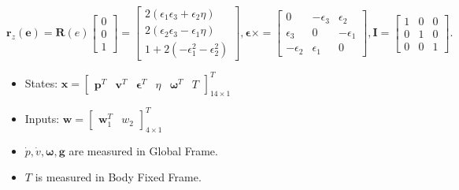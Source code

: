 \documentclass{beamer}
\begin{document}
\begin{frame}
    \begin{equation}
        \boldsymbol{r}_{z}(\boldsymbol{e})=\boldsymbol{R}(e)\left[\begin{array}{l}
                0 \\
                0 \\
                1
            \end{array}\right]=\left[\begin{array}{c}
                2\left(\epsilon_{1} \epsilon_{3}+\epsilon_{2} \eta\right) \\
                2\left(\epsilon_{2} \epsilon_{3}-\epsilon_{1} \eta\right) \\
                1+2\left(-\epsilon_{1}^{2}-\epsilon_{2}^{2}\right)
            \end{array}\right], \boldsymbol{\epsilon} \times=\left[\begin{array}{ccc}
                0             & -\epsilon_{3} & \epsilon_{2}  \\
                \epsilon_{3}  & 0             & -\epsilon_{1} \\
                -\epsilon_{2} & \epsilon_{1}  & 0
            \end{array}\right], \boldsymbol{I}=\left[\begin{array}{ccc}
                1 & 0 & 0 \\
                0 & 1 & 0 \\
                0 & 0 & 1
            \end{array}\right] .
    \end{equation}
    \begin{itemize}
        \item States: $\boldsymbol{x}=\left[\begin{array}{llllll}\boldsymbol{p}^{T} & \boldsymbol{v}^{T} & \boldsymbol{\epsilon}^{T} & \eta & \boldsymbol{\omega}^{T} & T\end{array}\right]_{14 \times 1}^{T}$
        \item Inputs: $\boldsymbol{w}=\left[\begin{array}{ll}\boldsymbol{w}_{1}^{T} & w_{2}\end{array}\right]_{4 \times 1}^{T}$
        \item $\dot{p}, \dot{v}, \boldsymbol{\omega}, \boldsymbol{g}$ are measured in Global Frame.
        \item $T$ is measured in Body Fixed Frame.
    \end{itemize}


\end{frame}
\end{document}
